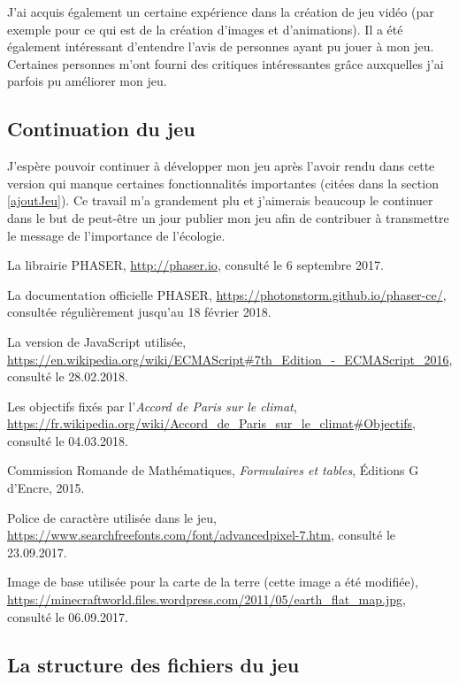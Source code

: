 \documentclass{article}
\begin{document}
		
		J'ai acquis également un certaine expérience dans la création de jeu vidéo (par exemple pour ce qui est de la création d'images et d'animations). Il a été également intéressant d'entendre l'avis de personnes ayant pu jouer à mon jeu. Certaines personnes m'ont fourni des critiques intéressantes grâce auxquelles j'ai parfois pu améliorer mon jeu.
		
		\subsection{Continuation du jeu}
		J'espère pouvoir continuer à développer mon jeu après l'avoir rendu dans cette version qui manque certaines fonctionnalités importantes (citées dans la section \ref{ajoutJeu}). Ce travail m'a grandement plu et j'aimerais beaucoup le continuer dans le but de peut-être un jour publier mon jeu afin de contribuer à transmettre le message de l'importance de l'écologie.
        
        \newpage
        \begin{thebibliography}{9}

  			La librairie PHASER,
  			\url{http://phaser.io},
  			consulté le 6 septembre 2017.
  			
  			La documentation officielle PHASER,
  			\url{https://photonstorm.github.io/phaser-ce/},
  			consultée régulièrement jusqu'au 18 février 2018.
  			
  			La version de JavaScript utilisée,
  			\url{https://en.wikipedia.org/wiki/ECMAScript#7th_Edition_-_ECMAScript_2016},
  			consulté le 28.02.2018.
  			
  			Les objectifs fixés par l'\textit{Accord de Paris sur le climat},
  			\url{https://fr.wikipedia.org/wiki/Accord_de_Paris_sur_le_climat#Objectifs},
  			consulté le 04.03.2018.
  			
  			Commission Romande de Mathématiques, 
  			\textit{Formulaires et tables},
  			Éditions G d'Encre,
  			2015.
  			
  			Police de caractère utilisée dans le jeu,
  			\url{https://www.searchfreefonts.com/font/advancedpixel-7.htm},
  			consulté le 23.09.2017.
  			
  			Image de base utilisée pour la carte de la terre (cette image a été modifiée),
  			\url{https://minecraftworld.files.wordpress.com/2011/05/earth_flat_map.jpg},
  			consulté le 06.09.2017.
 			
		\end{thebibliography}
		
		\begin{appendices}
			\section{La structure des fichiers du jeu} \label{structure}
		\end{appendices}
\end{document}
